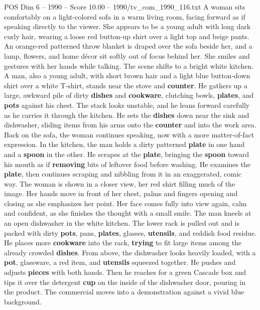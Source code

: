 \begin{textsample}{POS Dim 6 – 1990 – Score 10.00 – 1990/tv\_com\_1990\_116.txt}  \label{ex:f6_pos_072}
A woman sits comfortably on a light-colored sofa in a warm living room, facing forward as if speaking directly to the viewer.
She appears to be a young adult with long dark curly hair, wearing a loose red button-up shirt over a light top and beige pants.
An orange-red patterned throw blanket is draped over the sofa beside her, and a lamp, flowers, and home décor sit softly out of focus behind her.
She smiles and gestures with her hands while talking.
The scene shifts to a bright white kitchen.
A man, also a young adult, with short brown hair and a light blue button-down shirt over a white T-shirt, stands near the stove and \textbf{counter}.
He gathers up a large, awkward pile of dirty \textbf{dishes} and \textbf{cookware}, clutching bowls, \textbf{plates}, and \textbf{pots} against his chest.
The stack looks unstable, and he leans forward carefully as he carries it through the kitchen.
He sets the \textbf{dishes} down near the sink and dishwasher, sliding items from his arms onto the \textbf{counter} and into the work area.
Back on the sofa, the woman continues speaking, now with a more matter-of-fact expression.
In the kitchen, the man holds a dirty patterned \textbf{plate} in one hand and a \textbf{spoon} in the other.
He scrapes at the \textbf{plate}, bringing the \textbf{spoon} toward his mouth as if \textbf{removing} bits of leftover food before washing.
He examines the \textbf{plate}, then continues scraping and nibbling from it in an exaggerated, comic way.
The woman is shown in a closer view, her red shirt filling much of the image.
Her hands move in front of her chest, palms and fingers opening and closing as she emphasizes her point.
Her face comes fully into view again, calm and confident, as she finishes the thought with a small smile.
The man kneels at an open dishwasher in the white kitchen.
The lower rack is pulled out and is packed with dirty \textbf{pots}, pans, \textbf{plates}, glasses, \textbf{utensils}, and reddish food residue.
He places more \textbf{cookware} into the rack, \textbf{trying} to fit large items among the already crowded \textbf{dishes}.
From above, the dishwasher looks heavily loaded, with a \textbf{pot}, glassware, a red item, and \textbf{utensils} squeezed together.
He pushes and adjusts \textbf{pieces} with both hands.
Then he reaches for a green Cascade box and tips it over the detergent \textbf{cup} on the inside of the dishwasher door, pouring in the product.
The commercial moves into a demonstration against a vivid blue background.

\end{textsample}

